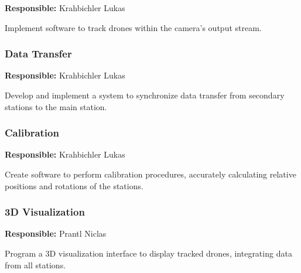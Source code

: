 \textbf{Responsible:} Krahbichler Lukas

Implement software to track drones within the camera's output stream.

\subsubsection{Data Transfer}

\textbf{Responsible:} Krahbichler Lukas

Develop and implement a system to synchronize data transfer from secondary stations to the main station.

\subsubsection{Calibration}

\textbf{Responsible:} Krahbichler Lukas

Create software to perform calibration procedures, accurately calculating relative positions and rotations of the stations.

\subsubsection{3D Visualization}

\textbf{Responsible:} Prantl Niclas

Program a 3D visualization interface to display tracked drones, integrating data from all stations.
